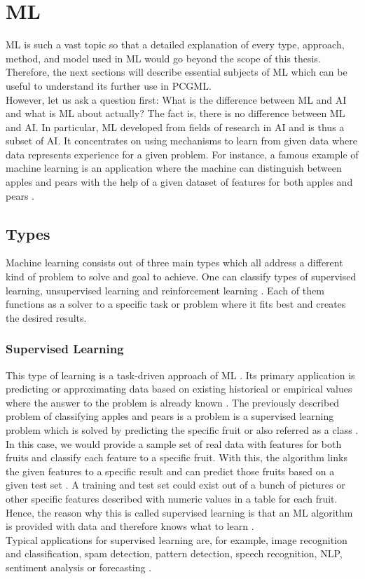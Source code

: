 \documentclass[MGS,Master,english]{twbook}%
\begin{document}
\chapter{\acl{ML}}
\ac{ML} is such a vast topic so that a detailed explanation of every type, approach, method, and model used in ML would go beyond the scope of this thesis. Therefore, the next sections will describe essential subjects of ML which can be useful to understand its further use in PCGML. \\
However, let us ask a question first: What is the difference between ML and AI and what is ML about actually? The fact is, there is no difference between ML and AI. In particular, ML developed from fields of research in AI and is thus a subset of AI. It concentrates on using mechanisms to learn from given data where data represents experience for a given problem. For instance, a famous example of machine learning is an application where the machine can distinguish between apples and pears with the help of a given dataset of features for both apples and pears \cite{ai::book}. 

\section{Types}
Machine learning consists out of three main types which all address a different kind of problem to solve and goal to achieve. One can classify types of supervised learning, unsupervised learning and reinforcement learning \cite{ml::book::developer}. Each of them functions as a solver to a specific task or problem where it fits best and creates the desired results.

\subsection{Supervised Learning}
This type of learning is a task-driven approach of ML \cite{ml::book::developer}. Its primary application is predicting or approximating data based on existing historical or empirical values where the answer to the problem is already known \cite{ai::book}. The previously described problem of classifying apples and pears is a problem is a supervised learning problem which is solved by predicting the specific fruit or also referred as a class \cite{ml::book::developer}. In this case, we would provide a sample set of real data with features for both fruits and classify each feature to a specific fruit. With this, the algorithm links the given features to a specific result and can predict those fruits based on a given test set \cite{ml::book::developer}. A training and test set could exist out of a bunch of pictures or other specific features described with numeric values in a table for each fruit. Hence, the reason why this is called supervised learning is that an ML algorithm is provided with data and therefore knows what to learn \cite{ai::book}.\\
Typical applications for supervised learning are, for example, image recognition and classification, spam detection, pattern detection, speech recognition, \ac{NLP}, sentiment analysis or forecasting \cite{ml::book::algorithms}.
\end{document}
